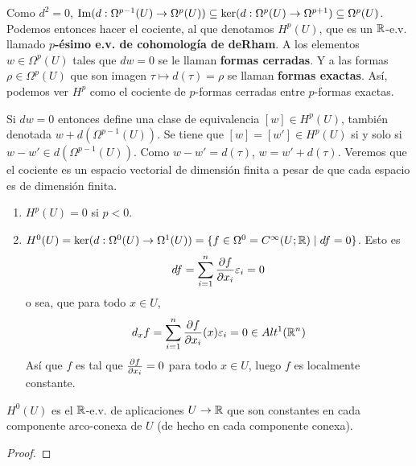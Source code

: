 \documentclass[CV.tex]{subfiles}
\begin{document}
\vspace{0.5cm}

Como $d^2=0$, $\operatorname{Im}(d:\Omega^{p-1}(U)\to\Omega^p(U))\subseteq\ker(d:\Omega^p(U)\to\Omega^{p+1})\subseteq\Omega^p(U)$. Podemos entonces hacer el cociente, al que denotamos $H^p(U)$, que es un $\mathbb{R}$-e.v. llamado \textbf{$p$-ésimo e.v. de cohomología de deRham}. A los elementos $w\in\Omega^p(U)$ tales que $dw=0$ se le llaman \textbf{formas cerradas}. Y a las formas $\rho\in\Omega^p(U)$ que son imagen $\tau\mapsto d(\tau)=\rho$ se llaman \textbf{formas exactas}. Así, podemos ver $H^p$ como el cociente de $p$-formas cerradas entre $p$-formas exactas. 

Si $dw=0$ entonces define una clase de equivalencia $[w]\in H^p(U)$, también denotada $w+d(\Omega^{p-1}(U))$. Se tiene que $[w]=[w']\in H^p(U)$ si y solo si $w-w'\in d(\Omega^{p-1}(U))$. Como $w-w'=d(\tau)$, $w=w'+d(\tau)$. Veremos que el cociente es un espacio vectorial de dimensión finita a pesar de que cada espacio es de dimensión finita. 

\begin{ej}
\begin{enumerate}
\item $H^p(U)=0$ si $p<0$.
\item $H^0(U)=\ker(d:\Omega^0(U)\to\Omega^1(U))=\{f\in\Omega^0=C^{\infty}(U;\mathbb{R})\mid df=0\}$. Esto es
\[
df=\sum_{i=1}^n\frac{\partial f}{\partial x_i}\varepsilon_i=0
\]
o sea, que para todo $x\in U$,
\[
d_xf=\sum_{i=1}^n\frac{\partial f}{\partial x_i}(x)\varepsilon_i=0\in Alt^1(\mathbb{R}^n)
\]
Así que $f$ es tal que $\frac{\partial f}{\partial x_i}=0$ para todo $x\in U$, luego $f$ es localmente constante. 
\end{enumerate}
\end{ej}

\begin{lemma}
$H^0(U)$ es el $\mathbb{R}$-e.v. de aplicaciones $U\to\mathbb{R}$ que son constantes en cada componente arco-conexa de $U$ (de hecho en cada componente conexa). 
\end{lemma}
\begin{proof}

\end{proof}
\end{document}
